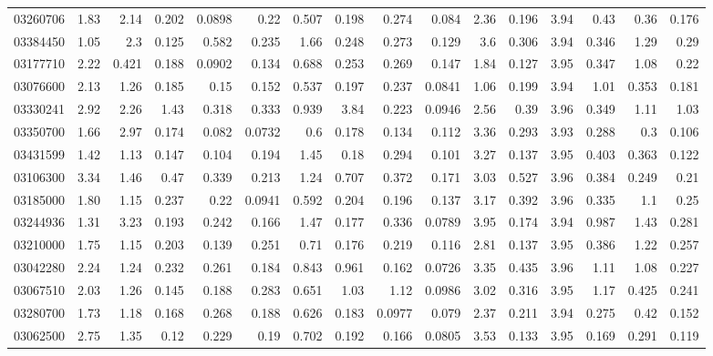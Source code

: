 \begin{longtable}{l r rr rr rr rr rr rr rr}
03260706 & 1.83 & 2.14 & {0.202} & 0.0898 & 0.22 & 0.507 & {0.198} & 0.274 & {0.084} & 2.36 & {0.196} & 3.94 & {0.43} & 0.36 & {0.176}\\
03384450 & 1.05 & 2.3 & {0.125} & 0.582 & {0.235} & 1.66 & {0.248} & 0.273 & {0.129} & 3.6 & {0.306} & 3.94 & {0.346} & 1.29 & {0.29}\\
03177710 & 2.22 & 0.421 & {0.188} & 0.0902 & 0.134 & 0.688 & {0.253} & 0.269 & {0.147} & 1.84 & {0.127} & 3.95 & {0.347} & 1.08 & {0.22}\\
03076600 & 2.13 & 1.26 & {0.185} & 0.15 & 0.152 & 0.537 & {0.197} & 0.237 & {0.0841} & 1.06 & {0.199} & 3.94 & {1.01} & 0.353 & {0.181}\\
03330241 & 2.92 & 2.26 & {1.43} & 0.318 & 0.333 & 0.939 & 3.84 & 0.223 & {0.0946} & 2.56 & {0.39} & 3.96 & {0.349} & 1.11 & {1.03}\\
03350700 & 1.66 & 2.97 & {0.174} & 0.082 & {0.0732} & 0.6 & {0.178} & 0.134 & {0.112} & 3.36 & {0.293} & 3.93 & {0.288} & 0.3 & {0.106}\\
03431599 & 1.42 & 1.13 & {0.147} & 0.104 & 0.194 & 1.45 & {0.18} & 0.294 & {0.101} & 3.27 & {0.137} & 3.95 & {0.403} & 0.363 & {0.122}\\
03106300 & 3.34 & 1.46 & {0.47} & 0.339 & {0.213} & 1.24 & {0.707} & 0.372 & {0.171} & 3.03 & {0.527} & 3.96 & {0.384} & 0.249 & {0.21}\\
03185000 & 1.80 & 1.15 & {0.237} & 0.22 & {0.0941} & 0.592 & {0.204} & 0.196 & {0.137} & 3.17 & {0.392} & 3.96 & {0.335} & 1.1 & {0.25}\\
03244936 & 1.31 & 3.23 & {0.193} & 0.242 & {0.166} & 1.47 & {0.177} & 0.336 & {0.0789} & 3.95 & {0.174} & 3.94 & {0.987} & 1.43 & {0.281}\\
03210000 & 1.75 & 1.15 & {0.203} & 0.139 & 0.251 & 0.71 & {0.176} & 0.219 & {0.116} & 2.81 & {0.137} & 3.95 & {0.386} & 1.22 & {0.257}\\
03042280 & 2.24 & 1.24 & {0.232} & 0.261 & {0.184} & 0.843 & 0.961 & 0.162 & {0.0726} & 3.35 & {0.435} & 3.96 & {1.11} & 1.08 & {0.227}\\
03067510 & 2.03 & 1.26 & {0.145} & 0.188 & 0.283 & 0.651 & 1.03 & 1.12 & {0.0986} & 3.02 & {0.316} & 3.95 & {1.17} & 0.425 & {0.241}\\
03280700 & 1.73 & 1.18 & {0.168} & 0.268 & {0.188} & 0.626 & {0.183} & 0.0977 & {0.079} & 2.37 & {0.211} & 3.94 & {0.275} & 0.42 & {0.152}\\
03062500 & 2.75 & 1.35 & {0.12} & 0.229 & {0.19} & 0.702 & {0.192} & 0.166 & {0.0805} & 3.53 & {0.133} & 3.95 & {0.169} & 0.291 & {0.119}\\

\end{longtable}
